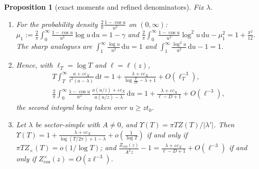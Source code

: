 \documentclass[11pt]{amsart}
\newcommand{\dd}{\,\mathrm{d}}
\newcommand{\eps}{\varepsilon}
\newtheorem{proposition}[theorem]{Proposition}
\theoremstyle{definition}
\theoremstyle{remark}
\numberwithin{equation}{section}
\begin{document}
\begin{proposition}[exact moments and refined denominators]\label{prop:T6}
Fix $\lambda$.
\begin{enumerate}
\item[(a)] For the probability density $\frac2\pi\frac{1-\cos u}{u^2}$ on $(0,\infty)$: $\mu_1:=\frac2\pi\int_0^\infty\frac{1-\cos u}{u^2}\log u\dd u=1-\gamma$ and $\frac2\pi\int_0^\infty\frac{1-\cos u}{u^2}\log^2u\dd u-\mu_1^2=1+\frac{\pi^2}{12}$. The sharp analogues are $\int_1^\infty\frac{\log u}{u^2}\dd u=1$ and $\int_1^\infty\frac{\log^2u}{u^2}\dd u-1=1$.
\item[(b)] Hence, with $\ell_T=\log T$ and $\ell=\ell(z)$,
\begin{gather*}
T\int_T^\infty\frac{a+\eps c_X}{t^2(a-\lambda)}\dd t=1+\frac{\lambda+\eps c_X}{\log\frac T{2\pi}-\lambda+1}+O(\ell_T^{-3}),\\
\frac2\pi\int_0^\infty\frac{1-\cos u}{u^2}\,\frac{a(u/z)+\eps c_X}{a(u/z)-\lambda}\dd u=1+\frac{\lambda+\eps c_X}{\ell-D+1}+O(\ell^{-3}),
\end{gather*}
the second integral being taken over $u\ge zt_0$.
\item[(c)] Let $\lambda$ be sector-simple with $A\ne0$, and $\Upsilon(T)=\pi TZ(T)/|\lambda'|$. Then $\Upsilon(T)=1+\frac{\lambda+\eps c_X}{\log(T/2\pi)+1-\lambda}+o(\frac1{\log T})$ if and only if $\pi TZ_\times(T)=o(1/\log T)$; and $\frac{Z_{\cos}(z)}{A^2z}-1=\frac{\lambda+\eps c_X}{\ell-D+1}+O(\ell^{-3})$ if and only if $Z^\times_{\cos}(z)=O(z\ell^{-3})$.
\end{enumerate}
\end{proposition}
\end{document}

